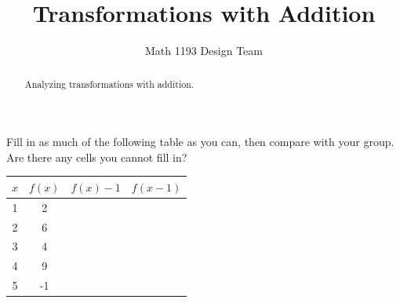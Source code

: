 \documentclass[noauthor]{ximera}
\title{Transformations with Addition}
\author{Math 1193 Design Team}
\begin{document}
\begin{abstract}
    Analyzing transformations with addition.
\end{abstract}
\maketitle

Fill in as much of the following table as you can, then 
compare with your group. Are there any cells you cannot fill in?

\begin{center}
\begin{tabular}{|c|c|c|c|} 
 \hline
 \(x\) & \(f(x)\) & \(f(x)-1\) & \(f(x - 1)\) \\
 \hline\hline
 1 & 2 &  &  \\ 
 \hline
 2 & 6 &  &  \\
 \hline
 3 & 4 &  &  \\
 \hline
 4 & 9 &  &  \\
 \hline
 5 & -1 &  &  \\
 \hline
\end{tabular}
\end{center}
\end{document}
